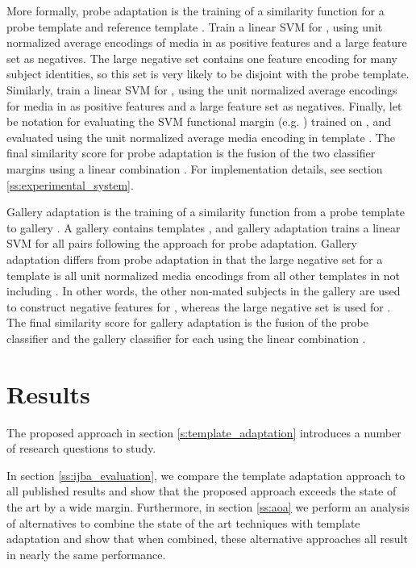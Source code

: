 \documentclass[10pt,twocolumn,letterpaper]{article}
\theoremstyle{definition}		\newtheorem{defn}[thm]{Definition}
\begin{document}
More formally, probe adaptation is the training of a similarity function  for a probe template  and reference template .  Train a linear SVM for , using unit normalized average encodings of media in  as positive features and a large feature set as negatives. The large negative set contains one feature encoding for many subject identities, so this set is very likely to be disjoint with the probe template. 
Similarly, train a linear SVM for , using the unit normalized average encodings for media in  as positive features and a large feature set as negatives.  Finally, let  be notation for evaluating the SVM functional margin (e.g. ) trained on , and evaluated using the unit normalized average media encoding  in template .  The final similarity score for probe adaptation is the fusion of the two classifier margins using a linear combination .  For implementation details, see section \ref{ss:experimental_system}.

Gallery adaptation is the training of a similarity function  from a probe template  to gallery .  A gallery contains templates , and gallery adaptation trains a linear SVM for all pairs  following the approach for probe adaptation.  Gallery adaptation differs from probe adaptation in that the large negative set for a template  is all unit normalized media encodings from all other templates in  not including .  In other words, the other non-mated subjects in the gallery are used to construct negative features for , whereas the large negative set is used for .  The final similarity score for gallery adaptation is the fusion of the probe classifier and the gallery classifier for each  using the linear combination .


















\section{Results}
\label{s:results}


The proposed approach in section \ref{s:template_adaptation} introduces a number of research questions to study.  
\medskip

  In section \ref{ss:ijba_evaluation}, we compare the template adaptation approach to all published results and show that the proposed approach exceeds the state of the art by a wide margin.  Furthermore, in section \ref{ss:aoa} we perform an analysis of alternatives to combine the state of the art techniques with template adaptation and show that when combined, these alternative approaches all result in nearly the same performance.
\smallskip
\end{document}
